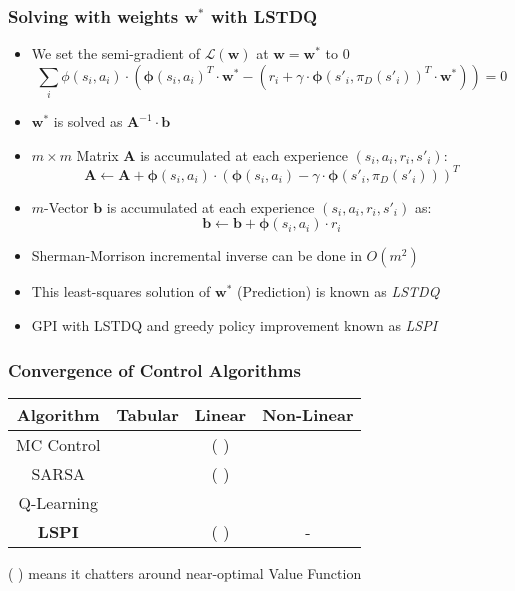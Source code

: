 \documentclass[handout]{beamer}
\newcommand{\cmark}{\ding{51}}%
\newcommand{\xmark}{\ding{55}}%
\begin{document}
\begin{frame}
\frametitle{Solving with weights $\bm{w}^*$ with LSTDQ}
\pause
\begin{itemize}[<+->]
\item We set the semi-gradient of $\mathcal{L}(\bm{w})$ at $\bm{w} = \bm{w}^*$ to 0
\begin{equation}
\sum_i \phi(s_i,a_i) \cdot (\bm{\phi}(s_i,a_i)^T \cdot \bm{w}^* - (r_i + \gamma \cdot \bm{\phi}(s'_i, \pi_D(s'_i))^T \cdot \bm{w}^*)) = 0
\label{eq:lspi-loss-semi-gradient}
\end{equation}
\item $\bm{w}^*$ is solved as $\bm{A}^{-1} \cdot \bm{b}$
\item $m \times m$ Matrix $\bm{A}$ is accumulated at each experience $(s_i,a_i,r_i,s'_i)$:
$$ \bm{A} \leftarrow \bm{A} + \bm{\phi}(s_i, a_i) \cdot (\bm{\phi}(s_i, a_i) - \gamma \cdot \bm{\phi}(s'_i, \pi_D(s'_i)))^T $$
\item $m$-Vector $\bm{b}$ is accumulated at each experience $(s_i,a_i,r_i,s'_i)$ as:
$$\bm{b} \leftarrow \bm{b} + \bm{\phi}(s_i, a_i) \cdot r_i$$
\item Sherman-Morrison incremental inverse can be done in $O(m^2)$
\item This least-squares solution of $\bm{w}^*$ (Prediction) is known as {\em LSTDQ}
\item GPI with LSTDQ and greedy policy improvement known as {\em LSPI}
\end{itemize}
\end{frame}

\begin{frame}
\frametitle{Convergence of Control Algorithms}
\pause
\begin{center}
      \begin{tabular}{cccc}
      \hline
      Algorithm & Tabular & Linear & Non-Linear \\ \hline
      MC Control & \cmark & ( \cmark ) & \xmark \\
      SARSA & \cmark & ( \cmark ) & \xmark \\ 
      Q-Learning & \cmark & \xmark & \xmark \\
      {\bf LSPI} & \cmark & ( \cmark ) & - \\ \hline
      \end{tabular}
 \end{center}     
  \pause
  ( \cmark ) means it chatters around near-optimal Value Function   
\end{frame}
\end{document}
